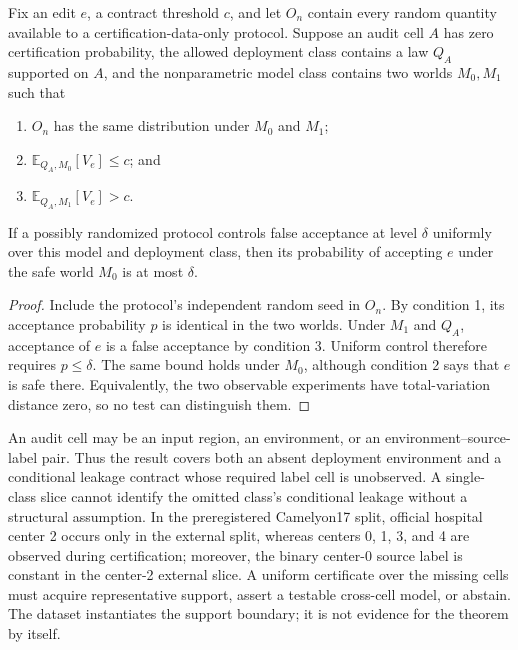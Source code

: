\begin{theorem}
\label{thm:unsupported}
Fix an edit $e$, a contract threshold $c$, and let $O_n$ contain every random
quantity available to a certification-data-only protocol. Suppose an audit cell
$A$ has zero certification probability, the allowed deployment class contains a
law $Q_A$ supported on $A$, and the nonparametric model class contains two
worlds $M_0,M_1$ such that
\begin{enumerate}
  \item $O_n$ has the same distribution under $M_0$ and $M_1$;
  \item $\mathbb{E}_{Q_A,M_0}[V_e]\leq c$; and
  \item $\mathbb{E}_{Q_A,M_1}[V_e]>c$.
\end{enumerate}
If a possibly randomized protocol controls false acceptance at level $\delta$
uniformly over this model and deployment class, then its probability of
accepting $e$ under the safe world $M_0$ is at most $\delta$.
\end{theorem}

\begin{proof}
Include the protocol's independent random seed in $O_n$. By condition 1, its
acceptance probability $p$ is identical in the two worlds. Under $M_1$ and
$Q_A$, acceptance of $e$ is a false acceptance by condition 3. Uniform control
therefore requires $p\leq\delta$. The same bound holds under $M_0$, although
condition 2 says that $e$ is safe there. Equivalently, the two observable
experiments have total-variation distance zero, so no test can distinguish
them.
\end{proof}

An audit cell may be an input region, an environment, or an
environment--source-label pair. Thus the result covers both an absent
deployment environment and a conditional leakage contract whose required
label cell is unobserved. A single-class slice cannot identify the omitted
class's conditional leakage without a structural assumption. In the
preregistered Camelyon17 split, official hospital center 2 occurs only in the
external split, whereas centers 0, 1, 3, and 4 are observed during
certification; moreover, the binary center-0 source label is constant in the
center-2 external slice. A uniform certificate over the missing cells must
acquire representative support, assert a testable cross-cell model, or abstain.
The dataset instantiates the support boundary; it is not evidence for the
theorem by itself.
